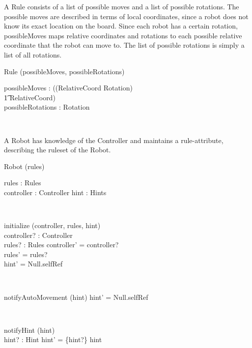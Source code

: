 \documentclass[12pt]{article}
\begin{document}
A Rule consists of a list of possible moves and a list of possible rotations. The possible moves are described in terms of local coordinates, since a robot does not know its exact location on the board. Since each robot has a certain rotation, possibleMoves maps relative coordinates and rotations to each possible relative coordinate that the robot can move to. The list of possible rotations is simply a list of all rotations.
\begin{class}{Rule}
\upharpoonright (possibleMoves, possibleRotations) \\
\begin{state}
possibleMoves : \power ((RelativeCoord \times Rotation) \psurj \\ \t1 \seq RelativeCoord) \\
possibleRotations : \power Rotation
\end{state} \\
\end{class}

A Robot has knowledge of the Controller and maintains a rule-attribute, describing the ruleset of the Robot.
\begin{class}{Robot}
\upharpoonright (rules) \\
\begin{state}
rules : Rules \\
controller : Controller
hint : Hints
\end{state}\\
\begin{schema}{initialize}
\Delta (controller, rules, hint) \\
controller? : Controller \\
rules? : Rules
\where
controller' = controller? \\
rules' = rules? \\
hint' = Null.selfRef
\end{schema}\\
\begin{schema}{notifyAutoMovement}
\Delta (hint)
\where
hint' = Null.selfRef
\end{schema}\\
\begin{schema}{notifyHint}
\Delta (hint) \\
hint? : Hint
\where
hint' = \{hint?\} \union hint
\end{schema}
\end{class}
\end{document}

